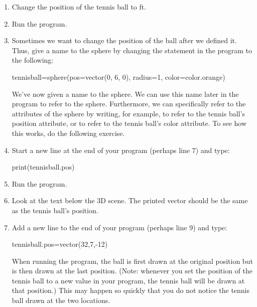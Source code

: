 \begin{enumerate}
\begin{vpythonprogram}
\end{vpythonprogram}
	
	
	\item Change the position of the tennis ball to  ft. 

	\item Run the program.

	\item Sometimes we want to change the position of the ball after we defined it. Thus, give a name to the sphere by changing the  statement in the program to the following:

\begin{myvpython}
tennisball=sphere(pos=vector(0, 6, 0), radius=1, color=color.orange)
\end{myvpython}

We've now given a name to the sphere. We can use this name later in the program to refer to the sphere. Furthermore, we can specifically refer to the attributes of the sphere by writing, for example,  to refer to the tennis ball's position attribute, or  to refer to the tennis ball's color attribute. To see how this works, do the following exercise.

	\item Start a new line at the end of your program (perhaps line 7) and type:

\begin{myvpython}
print(tennisball.pos)
\end{myvpython}


	\item Run the program.

	\item Look at the text below the 3D scene. The printed vector should be the same as the tennis ball's position.

	\item Add a new line to the end of your program (perhaps line 9) and type:
	
\begin{myvpython}
tennisball.pos=vector(32,7,-12)
\end{myvpython}
	
	When running the program, the ball is first drawn at the original position but is then drawn at the last position. (Note: whenever you set the position of the tennis ball to a new value in your program, the tennis ball will be drawn at that position.) This may happen so quickly that you do not notice the tennis ball drawn at the two locations.
	

\end{enumerate}

